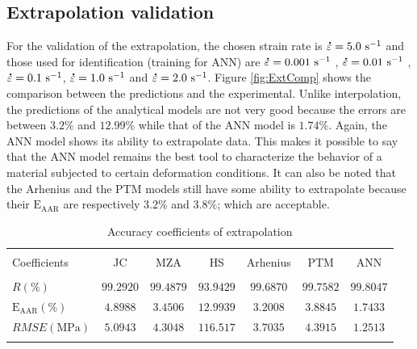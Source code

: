 \documentclass[twoside,english,1p,final,sort&compress]{elsarticle}
\theoremstyle{plain}
\newcommand{\mdot}[1]{\accentset{\mbox{\bfseries .}}{#1}}
\newcommand{\AARE}{\text{E}_\text{AAR}}
\newcommand{\ps}{\text{s}^{-1}}
\begin{document}
\subsection{Extrapolation validation}
For the validation of the extrapolation, the chosen strain rate is $\mdot\varepsilon = 5.0\ \ps$ and those used for identification (training for ANN) are $\mdot\varepsilon = 0.001\ \ps$ , $\mdot\varepsilon = 0.01\ \ps$ , $\mdot\varepsilon = 0.1\ \ps$, $\mdot\varepsilon = 1.0\ \ps$  and $\mdot\varepsilon = 2.0\ \ps$.
Figure \ref{fig:ExtComp} shows the comparison between the predictions  and the experimental.
Unlike interpolation, the predictions of the analytical models are not very good because the errors are between $3.2\%$ and $12.99\%$ while that of the ANN model is $1.74\%$.
Again, the ANN model shows its ability to extrapolate data.
This makes it possible to say that the ANN model remains the best tool to characterize the behavior of a material subjected to certain deformation conditions.
It can also be noted that the Arhenius and the PTM models still have some ability to extrapolate because their $\AARE$ are respectively $ 3.2 \% $ and $ 3.8 \%$; which are acceptable.
\begin{table}[h!]
\centering{}
\caption{Accuracy coefficients of extrapolation}
\begin{tabular}{lcccccc}
\hline
&		&		&         &             &		   &	\\
Coefficients&JC  & MZA  &HS  & Arhenius      & PTM  &ANN \\
&				&				&         &             &	&\\
\hline
$R(\%)$&$99.2920$&$99.4879$&$93.9429$&$99.6870$& $99.7582$&$99.8047$\\
$\AARE(\%)$&$4.8988$&$3.4506$&$12.9939$&$3.2008$&$3.8845$&$1.7433$\\
$RMSE(\text{MPa})$&$5.0943$&$4.3048$&$116.517$&$3.7035$&$4.3915$&$1.2513$ \\
\hline
\label{tab:ExtVal}
\end{tabular}
\end{table}
\end{document}
